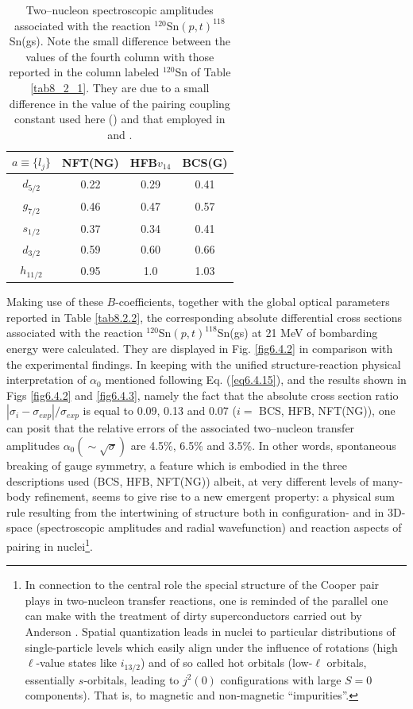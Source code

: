 \begin{table}
\begin{center}
\begin{tabular}{|c|c|c|c|}
\hline
$a\equiv\{l_j\}$ & NFT(NG)  & HFB$v_{14}$  & BCS(G)  \\ 
 \hline 
$d_{5/2}$ & 0.22 & 0.29 & 0.41 \\ 
\hline 
$g_{7/2}$ & 0.46 & 0.47 &  0.57\\ 
 \hline
$s_{1/2}$ & 0.37 & 0.34 & 0.41 \\ 
 \hline
$d_{3/2}$ & 0.59 & 0.60 & 0.66 \\ 
 \hline
$h_{11/2}$ & 0.95 & 1.0 & 1.03\\
 \hline
\end{tabular}
\end{center}
\caption{Two--nucleon spectroscopic amplitudes associated with the reaction $^{120}$Sn$(p,t)^{118}$Sn(gs). Note the small difference between the values of the fourth column with those reported in the column labeled $^{120}$Sn of Table \ref{tab8_2_1}. They are due to a small difference in the value of the pairing coupling constant used here  (\cite{Potel:17}) and that employed in \cite{Potel:17} and \cite{Potel:13b}.}\label{tab6.4.3}
\end{table} 

Making use of these $B$-coefficients, together with the global optical parameters reported in Table \ref{tab8.2.2}, the corresponding absolute differential cross sections associated with the reaction $^{120}$Sn$(p,t)^{118}$Sn(gs) at 21 MeV of bombarding energy were calculated. They are displayed in Fig. \ref{fig6.4.2} in comparison with the experimental findings. In keeping with the unified structure-reaction physical interpretation of $\alpha_0$ mentioned following Eq. (\ref{eq6.4.15}), and 
the results shown in Figs \ref{fig6.4.2} and \ref{fig6.4.3}, namely the fact that the absolute cross section ratio $|\sigma_i-\sigma_{exp}|/\sigma_{exp}$ is equal to 0.09, 0.13 and 0.07 ($i=$ BCS, HFB, NFT(NG)), one can posit that the relative errors of the associated two--nucleon transfer amplitudes $\alpha_0(\sim\sqrt{\sigma})$ are 4.5\%, 6.5\% and 3.5\%. In other words, spontaneous breaking of gauge symmetry, a feature which is embodied in the three descriptions used (BCS, HFB, NFT(NG)) albeit, at very different levels of many-body refinement, seems to give rise to a new emergent property: a physical sum rule resulting from the intertwining of structure both in configuration- and in 3D-space (spectroscopic amplitudes and radial wavefunction) and reaction aspects of pairing in nuclei\footnote{In connection to the central role the special structure of the Cooper pair plays in two-nucleon transfer reactions, one is reminded of the parallel one can make with the treatment of dirty superconductors carried out by Anderson \citep{Anderson:59}. Spatial quantization leads in nuclei to particular distributions of single-particle levels which easily align under the influence of rotations (high $\ell$-value states like $i_{13/2}$) and of so called hot orbitals (low-$\ell$ orbitals, essentially $s$-orbitals, leading to $j^2(0)$ configurations  with large $S=0$ components). That is, to magnetic and non-magnetic ``impurities''.}. 

